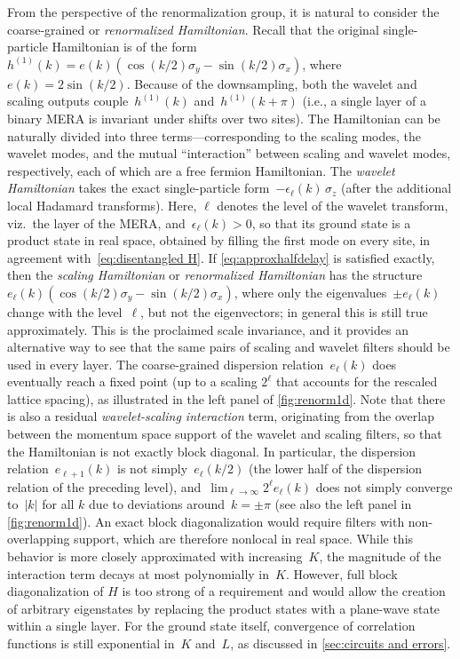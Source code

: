 \documentclass[aps,pra,reprint,superscriptaddress,floatfix,amsmath,amssymb,amsfonts]{revtex4-1}
\begin{document}
From the perspective of the renormalization group, it is natural to consider the coarse-grained or \emph{renormalized Hamiltonian}.
Recall that the original single-particle Hamiltonian is of the form~$h^{(1)}(k) = e(k) (\cos(k/2) \sigma_y - \sin(k/2) \sigma_x)$, where~$e(k) = 2 \sin(k/2)$.
Because of the downsampling, both the wavelet and scaling outputs couple~$h^{(1)}(k)$ and~$h^{(1)}(k+\pi)$ (i.e., a single layer of a binary MERA is invariant under shifts over two sites).
The Hamiltonian can be naturally divided into three terms---corresponding to the scaling modes, the wavelet modes, and the mutual ``interaction'' between scaling and wavelet modes, respectively, each of which are a free fermion Hamiltonian.
The \emph{wavelet Hamiltonian} takes the exact single-particle form~$-\epsilon_\ell(k) \, \sigma_z$ (after the additional local Hadamard transforms).
Here, $\ell$ denotes the level of the wavelet transform, viz.\ the layer of the MERA, and~$\epsilon_\ell(k)>0$, so that its ground state is a product state in real space, obtained by filling the first mode on every site, in agreement with~\cref{eq:disentangled H}.
If \cref{eq:approxhalfdelay} is satisfied exactly, then the \emph{scaling Hamiltonian} or \emph{renormalized Hamiltonian} has the structure~$e_\ell(k) (\cos(k/2) \sigma_y - \sin(k/2) \sigma_x)$, where only the eigenvalues~$\pm e_\ell(k)$ change with the level~$\ell$, but not the eigenvectors; in general this is still true approximately.
This is the proclaimed scale invariance, and it provides an alternative way to see that the same pairs of scaling and wavelet filters should be used in every layer.
The coarse-grained dispersion relation~$e_\ell(k)$ does eventually reach a fixed point (up to a scaling $2^\ell$ that accounts for the rescaled lattice spacing), as illustrated in the left panel of \cref{fig:renorm1d}.
Note that there is also a residual \emph{wavelet-scaling interaction} term, originating from the overlap between the momentum space support of the wavelet and scaling filters, so that the Hamiltonian is not exactly block diagonal.
In particular, the dispersion relation~$e_{\ell+1}(k)$ is not simply~$e_\ell(k/2)$ (the lower half of the dispersion relation of the preceding level), and~$\lim_{\ell\to\infty} 2^\ell e_\ell(k)$ does not simply converge to~$\lvert k\rvert$ for all $k$ due to deviations around~$k=\pm \pi$ (see also the left panel in \cref{fig:renorm1d}).
An exact block diagonalization would require filters with non-overlapping support, which are therefore nonlocal in real space. While this behavior is more closely approximated with increasing~$K$, the magnitude of the interaction term decays at most polynomially in~$K$.
However, full block diagonalization of $H$ is too strong of a requirement and would allow the creation of arbitrary eigenstates by replacing the product states with a plane-wave state within a single layer.
For the ground state itself, convergence of correlation functions is still exponential in~$K$ and~$L$, as discussed in \cref{sec:circuits and errors}.
\end{document}
